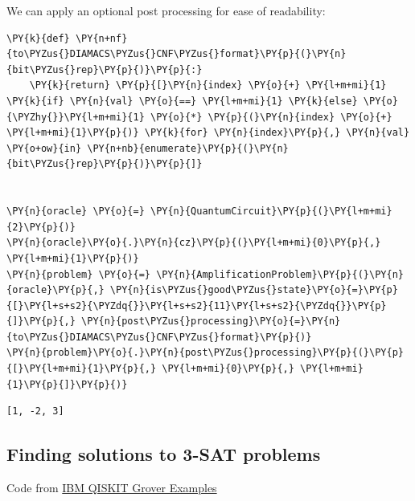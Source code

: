 We can apply an optional post processing for ease of readability:

    \begin{tcolorbox}[breakable, size=fbox, boxrule=1pt, pad at break*=1mm,colback=cellbackground, colframe=cellborder]
\begin{Verbatim}[commandchars=\\\{\}]
\PY{k}{def} \PY{n+nf}{to\PYZus{}DIAMACS\PYZus{}CNF\PYZus{}format}\PY{p}{(}\PY{n}{bit\PYZus{}rep}\PY{p}{)}\PY{p}{:}
    \PY{k}{return} \PY{p}{[}\PY{n}{index} \PY{o}{+} \PY{l+m+mi}{1} \PY{k}{if} \PY{n}{val} \PY{o}{==} \PY{l+m+mi}{1} \PY{k}{else} \PY{o}{\PYZhy{}}\PY{l+m+mi}{1} \PY{o}{*} \PY{p}{(}\PY{n}{index} \PY{o}{+} \PY{l+m+mi}{1}\PY{p}{)} \PY{k}{for} \PY{n}{index}\PY{p}{,} \PY{n}{val} \PY{o+ow}{in} \PY{n+nb}{enumerate}\PY{p}{(}\PY{n}{bit\PYZus{}rep}\PY{p}{)}\PY{p}{]}


\PY{n}{oracle} \PY{o}{=} \PY{n}{QuantumCircuit}\PY{p}{(}\PY{l+m+mi}{2}\PY{p}{)}
\PY{n}{oracle}\PY{o}{.}\PY{n}{cz}\PY{p}{(}\PY{l+m+mi}{0}\PY{p}{,} \PY{l+m+mi}{1}\PY{p}{)}
\PY{n}{problem} \PY{o}{=} \PY{n}{AmplificationProblem}\PY{p}{(}\PY{n}{oracle}\PY{p}{,} \PY{n}{is\PYZus{}good\PYZus{}state}\PY{o}{=}\PY{p}{[}\PY{l+s+s2}{\PYZdq{}}\PY{l+s+s2}{11}\PY{l+s+s2}{\PYZdq{}}\PY{p}{]}\PY{p}{,} \PY{n}{post\PYZus{}processing}\PY{o}{=}\PY{n}{to\PYZus{}DIAMACS\PYZus{}CNF\PYZus{}format}\PY{p}{)}
\PY{n}{problem}\PY{o}{.}\PY{n}{post\PYZus{}processing}\PY{p}{(}\PY{p}{[}\PY{l+m+mi}{1}\PY{p}{,} \PY{l+m+mi}{0}\PY{p}{,} \PY{l+m+mi}{1}\PY{p}{]}\PY{p}{)}
\end{Verbatim}
\end{tcolorbox}

            \begin{tcolorbox}[breakable, size=fbox, boxrule=.5pt, pad at break*=1mm, opacityfill=0]
\begin{Verbatim}[commandchars=\\\{\}]
[1, -2, 3]
\end{Verbatim}
\end{tcolorbox}
        
    \hypertarget{finding-solutions-to-3-sat-problems}{%
\subsection*{Finding solutions to 3-SAT
problems}\label{finding-solutions-to-3-sat-problems}}

Code from
\href{https://qiskit-community.github.io/qiskit-algorithms/tutorials/07_grover_examples.html}{IBM
QISKIT Grover Examples}


